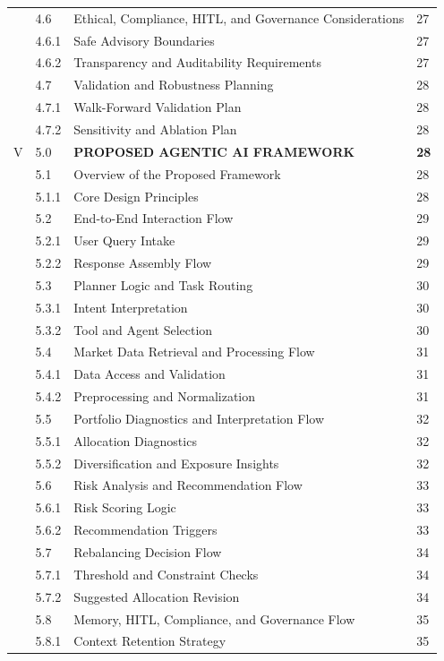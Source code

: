 \documentclass[11pt]{article}
\begin{document}
\begin{longtable}{C{0.8cm}C{1.2cm}L{9.7cm}C{1.2cm}}
 & 4.6 & Ethical, Compliance, HITL, and Governance Considerations & 27 \\
 & 4.6.1 & Safe Advisory Boundaries & 27 \\
 & 4.6.2 & Transparency and Auditability Requirements & 27 \\
 & 4.7 & Validation and Robustness Planning & 28 \\
 & 4.7.1 & Walk-Forward Validation Plan & 28 \\
 & 4.7.2 & Sensitivity and Ablation Plan & 28 \\
V & 5.0 & \textbf{PROPOSED AGENTIC AI FRAMEWORK} & \textbf{28} \\
 & 5.1 & Overview of the Proposed Framework & 28 \\
 & 5.1.1 & Core Design Principles & 28 \\
 & 5.2 & End-to-End Interaction Flow & 29 \\
 & 5.2.1 & User Query Intake & 29 \\
 & 5.2.2 & Response Assembly Flow & 29 \\
 & 5.3 & Planner Logic and Task Routing & 30 \\
 & 5.3.1 & Intent Interpretation & 30 \\
 & 5.3.2 & Tool and Agent Selection & 30 \\
 & 5.4 & Market Data Retrieval and Processing Flow & 31 \\
 & 5.4.1 & Data Access and Validation & 31 \\
 & 5.4.2 & Preprocessing and Normalization & 31 \\
 & 5.5 & Portfolio Diagnostics and Interpretation Flow & 32 \\
 & 5.5.1 & Allocation Diagnostics & 32 \\
 & 5.5.2 & Diversification and Exposure Insights & 32 \\
 & 5.6 & Risk Analysis and Recommendation Flow & 33 \\
 & 5.6.1 & Risk Scoring Logic & 33 \\
 & 5.6.2 & Recommendation Triggers & 33 \\
 & 5.7 & Rebalancing Decision Flow & 34 \\
 & 5.7.1 & Threshold and Constraint Checks & 34 \\
 & 5.7.2 & Suggested Allocation Revision & 34 \\
 & 5.8 & Memory, HITL, Compliance, and Governance Flow & 35 \\
 & 5.8.1 & Context Retention Strategy & 35 \\

\end{longtable}
\end{document}
